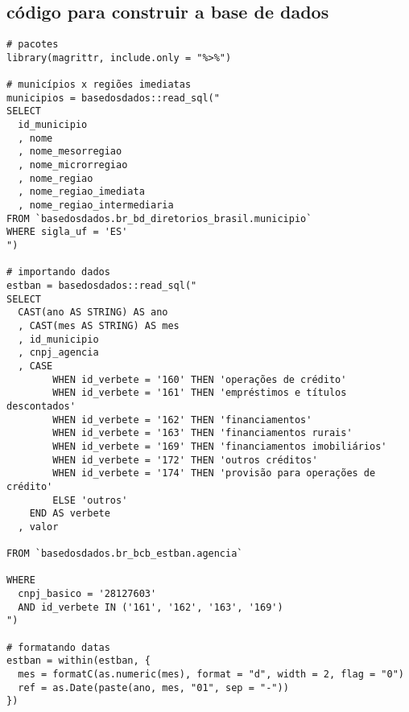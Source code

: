 \postextual

%
%
%
%
%

\begin{anexosenv}
\partanexos

\chapter{código para construir a base de dados}

\begin{lstlisting}[frame=single]
# pacotes
library(magrittr, include.only = "%>%")

# municípios x regiões imediatas
municipios = basedosdados::read_sql("
SELECT
  id_municipio
  , nome
  , nome_mesorregiao
  , nome_microrregiao
  , nome_regiao
  , nome_regiao_imediata
  , nome_regiao_intermediaria
FROM `basedosdados.br_bd_diretorios_brasil.municipio`
WHERE sigla_uf = 'ES'
")

# importando dados
estban = basedosdados::read_sql("
SELECT
  CAST(ano AS STRING) AS ano
  , CAST(mes AS STRING) AS mes
  , id_municipio
  , cnpj_agencia
  , CASE
        WHEN id_verbete = '160' THEN 'operações de crédito'
        WHEN id_verbete = '161' THEN 'empréstimos e títulos descontados'
        WHEN id_verbete = '162' THEN 'financiamentos'
        WHEN id_verbete = '163' THEN 'financiamentos rurais'
        WHEN id_verbete = '169' THEN 'financiamentos imobiliários'
        WHEN id_verbete = '172' THEN 'outros créditos'
        WHEN id_verbete = '174' THEN 'provisão para operações de crédito'
        ELSE 'outros'
    END AS verbete
  , valor

FROM `basedosdados.br_bcb_estban.agencia`

WHERE
  cnpj_basico = '28127603'
  AND id_verbete IN ('161', '162', '163', '169')
")

# formatando datas
estban = within(estban, {
  mes = formatC(as.numeric(mes), format = "d", width = 2, flag = "0")
  ref = as.Date(paste(ano, mes, "01", sep = "-"))
})


\end{lstlisting}
\end{anexosenv}
